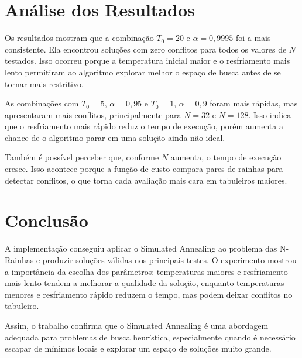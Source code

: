 \documentclass[12pt,a4paper]{article}
\begin{document}
\section{Análise dos Resultados}

Os resultados mostram que a combinação $T_0 = 20$ e $\alpha = 0{,}9995$ foi a mais consistente. Ela encontrou soluções com zero conflitos para todos os valores de $N$ testados. Isso ocorreu porque a temperatura inicial maior e o resfriamento mais lento permitiram ao algoritmo explorar melhor o espaço de busca antes de se tornar mais restritivo.

As combinações com $T_0 = 5$, $\alpha = 0{,}95$ e $T_0 = 1$, $\alpha = 0{,}9$ foram mais rápidas, mas apresentaram mais conflitos, principalmente para $N = 32$ e $N = 128$. Isso indica que o resfriamento mais rápido reduz o tempo de execução, porém aumenta a chance de o algoritmo parar em uma solução ainda não ideal.

Também é possível perceber que, conforme $N$ aumenta, o tempo de execução cresce. Isso acontece porque a função de custo compara pares de rainhas para detectar conflitos, o que torna cada avaliação mais cara em tabuleiros maiores.

\section{Conclusão}

A implementação conseguiu aplicar o Simulated Annealing ao problema das N-Rainhas e produzir soluções válidas nos principais testes. O experimento mostrou a importância da escolha dos parâmetros: temperaturas maiores e resfriamento mais lento tendem a melhorar a qualidade da solução, enquanto temperaturas menores e resfriamento rápido reduzem o tempo, mas podem deixar conflitos no tabuleiro.

Assim, o trabalho confirma que o Simulated Annealing é uma abordagem adequada para problemas de busca heurística, especialmente quando é necessário escapar de mínimos locais e explorar um espaço de soluções muito grande.
\end{document}
